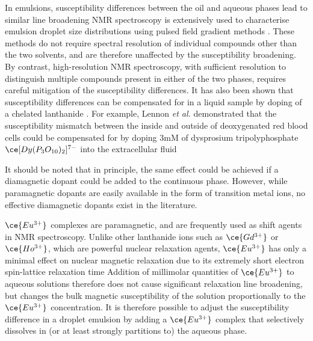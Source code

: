 In emulsions, susceptibility differences between the oil and aqueous phases
lead to similar line broadening \citep{Kuchel:2003ip} NMR spectroscopy is extensively
used to characterise emulsion droplet size distributions using pulsed
field gradient methods \citep{VANDENENDEN:1990ck,FOUREL:1994jv,
Hollingsworth:2004iy,Hindmarsh:2005en,Johns:2009ib,Bernewitz:2011km,Lingwood:2012je}.
These methods do not require spectral resolution of individual
compounds other than the two solvents, and are therefore
unaffected by the susceptibility broadening. By contrast, high-resolution
NMR spectroscopy, with sufficient resolution to distinguish multiple
compounds present in either of the two phases,
requires careful mitigation of the susceptibility differences. It has also been shown that susceptibility differences can
be compensated for in a liquid sample by doping of a chelated lanthanide \citep{fabry1983effect}.
For example, Lennon \emph{et al.} demonstrated that the susceptibility mismatch between the inside and outside of deoxygenated red blood cells could be
compensated for by doping 3mM of dysprosium tripolyphosphate $\ce[{Dy(P_3O_{10})_2}]^{7-}$ into the extracellular fluid \citep{lennon1994hemoglobin}

It should be noted that in principle, the same effect could be achieved if
a diamagnetic dopant could be added to the continuous phase. However, while paramagnetic
dopants are easily available in the form of transition metal ions, no
effective diamagnetic dopants exist in the literature.

$\ce{Eu^{3+}}$ complexes are paramagnetic, and are frequently used as
shift agents in NMR spectroscopy. Unlike other lanthanide ions such
as $\ce{Gd^{3+}}$ or $\ce{Ho^{3+}}$, which are powerful nuclear relaxation
agents, $\ce{Eu^{3+}}$ has only a minimal
effect on nuclear magnetic relaxation due to its extremely
short electron spin-lattice relaxation time \citep{Peters:1996bj} Addition of
millimolar quantities of $\ce{Eu^{3+}}$ to aqueous solutions
therefore does not cause significant relaxation line broadening, but changes
the bulk magnetic susceptibility of the solution proportionally
to the $\ce{Eu^{3+}}$ concentration. It is therefore possible
to adjust the susceptibility difference in a droplet emulsion
by adding a $\ce{Eu^{3+}}$ complex that selectively dissolves in (or at least
strongly partitions to) the aqueous phase.


